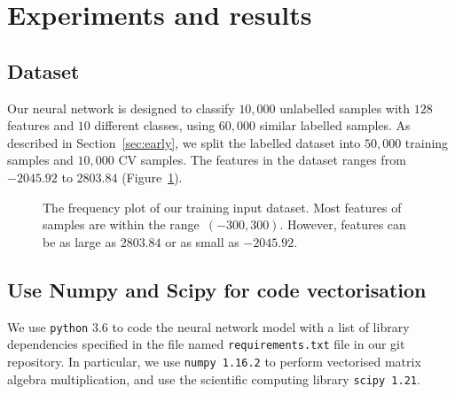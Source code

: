 \section{Experiments and results}\label{chapter4}

\subsection{Dataset}

Our neural network is designed to classify $10,000$ unlabelled samples with $128$ features and $10$ different classes, using $60,000$ similar labelled samples. As described in Section~\ref{sec:early}, we split the labelled dataset into $50,000$ training samples and $10,000$ CV samples. The features in the dataset ranges from $-2045.92$ to $2803.84$ (Figure~\ref{fig:freq-hist}).
\begin{figure}
    \caption{The frequency plot of our training input dataset. Most features of samples are within the range~$(-300,300)$. However, features can be as large as $2803.84$ or as small as $-2045.92$.}
    \label{fig:freq-hist}
\end{figure}

\subsection{Use Numpy and Scipy for code vectorisation}
We use \texttt{python} 3.6 to code the neural network model with a list of library dependencies specified in the file named \texttt{requirements.txt} file in our git repository. 
In particular, we use \texttt{numpy 1.16.2}  to perform vectorised matrix algebra multiplication, and use the scientific computing library \texttt{scipy 1.21}.

